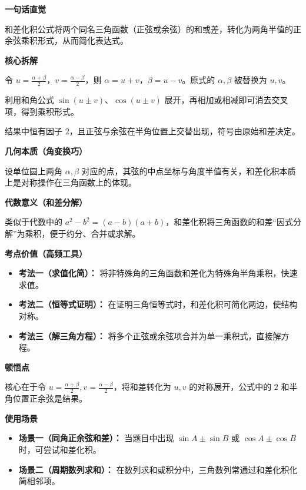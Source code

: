 \begin{explanationbox}
	\textbf{\textcolor{CExplanation}{一句话直觉}}

	和差化积公式将两个同名三角函数（正弦或余弦）的和或差，转化为两角半值的正余弦乘积形式，从而简化表达式。

	\medskip
	\textbf{\textcolor{CExplanation}{核心拆解}}
	\begin{description}[style=nextline, leftmargin=2.8em, labelsep=0.5em, itemsep=0.45em]
		\item[\textbf{要点一（变量代换）：}] 令 $u=\frac{\alpha+\beta}{2}$，$v=\frac{\alpha-\beta}{2}$，则 $\alpha=u+v$，$\beta=u-v$。原式的 $\alpha,\beta$ 被替换为 $u,v$。
		\item[\textbf{要点二（和角展开）：}] 利用和角公式 $\sin(u\pm v)$、$\cos(u\pm v)$ 展开，再相加或相减即可消去交叉项，得到乘积形式。
		\item[\textbf{要点三（系数规律）：}] 结果中恒有因子 $2$，且正弦与余弦在半角位置上交替出现，符号由原始和差决定。
	\end{description}

	\medskip
	\textbf{\textcolor{CExplanation}{几何本质（角变换巧）}}

	设单位圆上两角 $\alpha,\beta$ 对应的点，其弦的中点坐标与角度半值有关，和差化积本质上是对称操作在三角函数上的体现。

	\medskip
	\textbf{\textcolor{CExplanation}{代数意义（和差分解）}}

	类似于代数中的 $a^2-b^2=(a-b)(a+b)$，和差化积将三角函数的和差“因式分解”为乘积，便于约分、合并或求解。

	\medskip
	\textbf{\textcolor{CExplanation}{考点价值（高频工具）}}
	\begin{itemize}[leftmargin=*, itemsep=0.5em, topsep=0.4em]
		\item \textbf{考法一（求值化简）：} 将非特殊角的三角函数和差化为特殊角半角乘积，快速求值。
		\item \textbf{考法二（恒等式证明）：} 在证明三角恒等式时，和差化积可简化两边，使结构对称。
		\item \textbf{考法三（解三角方程）：} 将多个正弦或余弦项合并为单一乘积式，直接解方程。
	\end{itemize}

	\medskip
	\textbf{\textcolor{CExplanation}{顿悟点}}

	核心在于令 $u=\frac{\alpha+\beta}{2}, v=\frac{\alpha-\beta}{2}$，将和差转化为 $u,v$ 的对称展开，公式中的 $2$ 和半角位置正余弦是结果。

	\medskip
	\textbf{\textcolor{CExplanation}{使用场景}}
	\begin{itemize}[leftmargin=*, itemsep=0.5em, topsep=0.4em]
		\item \textbf{场景一（同角正余弦和差）：} 当题目中出现 $\sin A\pm\sin B$ 或 $\cos A\pm\cos B$ 时，可尝试和差化积。
		\item \textbf{场景二（周期数列求和）：} 在数列求和或积分中，三角数列常通过和差化积化简相邻项。
	\end{itemize}
\end{explanationbox}
